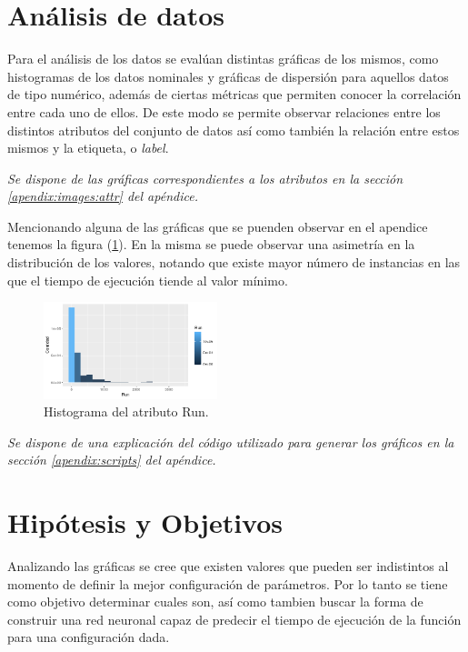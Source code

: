 \documentclass[osajnl,twocolumn,showpacs,superscriptaddress,10pt]{revtex4-1} %
\begin{document}
\section{Análisis de datos}

Para el análisis de los datos se evalúan distintas gráficas de los mismos, como histogramas de los datos nominales y gráficas de dispersión para aquellos datos de tipo numérico, además de ciertas métricas que permiten conocer la correlación entre cada uno de ellos. De este modo se permite observar relaciones entre los distintos atributos del conjunto de datos así como también la relación entre estos mismos y la etiqueta, o \textit{label}.

\begin{flushright}
\textit{\footnotesize Se dispone de las gráficas correspondientes a los atributos en la sección \ref{apendix:images:attr} del apéndice.}
\end{flushright}

Mencionando alguna de las gráficas que se puenden observar en el apendice tenemos la figura (\ref{figure:run_hist_1}). En la misma se puede observar una asimetría en la distribución de los valores, notando que existe mayor número de instancias en las que el tiempo de ejecución tiende al valor mínimo.

\begin{figure}[H]
    \centering
    \includegraphics[width=0.45\textwidth]{plots/run_hist}
    \caption{Histograma del atributo Run.}
    \label{figure:run_hist_1}
\end{figure}

\begin{flushright}
\textit{\footnotesize Se dispone de una explicación del código utilizado para generar los gráficos en la sección \ref{apendix:scripts} del apéndice.}
\end{flushright}

\section{Hipótesis y Objetivos}

Analizando las gráficas se cree que existen valores que pueden ser indistintos al momento de definir la mejor configuración de parámetros. Por lo tanto se tiene como objetivo determinar cuales son, así como tambien buscar la forma de construir una red neuronal capaz de predecir el tiempo de ejecución de la función para una configuración dada. \\
\end{document}
